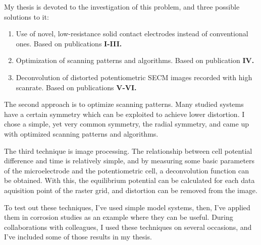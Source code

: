 My thesis is devoted to the investigation of this problem, and three possible solutions to it:

\begin{enumerate}
\item Use of novel, low-resistance solid contact electrodes instead of conventional ones. Based on publications \textbf{\color{blue}I-III.}
\item Optimization of scanning patterns and algorithms. Based on publication \textbf{\color{blue}IV.}
\item Deconvolution of distorted potentiometric SECM images recorded with high scanrate. Based on publications \textbf{\color{blue}V-VI.}
\end{enumerate}

The second approach is to optimize scanning patterns. Many studied systems have a certain symmetry which can be exploited to achieve lower distortion. I chose a simple, yet very common symmetry, the radial symmetry, and came up with optimized scanning patterns and algorithms.

The third technique is image processing. The relationship between cell potential difference and time is relatively simple, and by measuring some basic parameters of the microelectrode and the potentiometric cell, a deconvolution function can be obtained. With this, the equilibrium potential can be calculated for each data aquisition point of the raster grid, and distortion can be removed from the image.

To test out these techniques, I've used simple model systems, then, I've applied them in corrosion studies as an example where they can be useful. During collaborations with colleagues, I used these techniques on several occasions, and I've included some of those results in my thesis.



